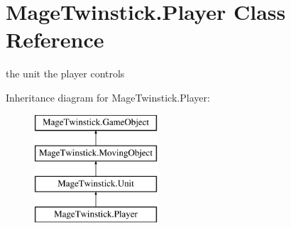 \hypertarget{class_mage_twinstick_1_1_player}{}\section{Mage\+Twinstick.\+Player Class Reference}
\label{class_mage_twinstick_1_1_player}


the unit the player controls  


Inheritance diagram for Mage\+Twinstick.\+Player\+:\begin{figure}[H]
\begin{center}
\leavevmode
\includegraphics[height=4.000000cm]{class_mage_twinstick_1_1_player}
\end{center}
\end{figure}
